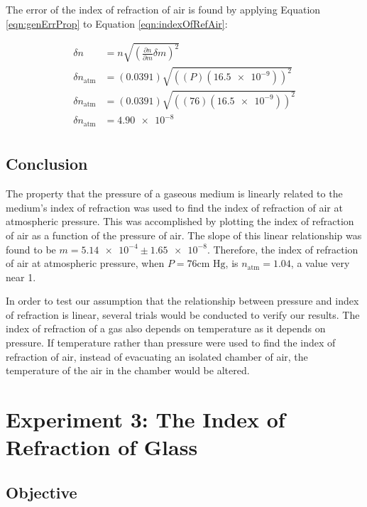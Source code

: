 \documentclass[12pt]{article}
\begin{document}
The error of the index of refraction of air is found by applying Equation
\ref{eqn:genErrProp} to Equation \ref{eqn:indexOfRefAir}:

\begin{align*}
  \delta n &= n \sqrt{\left( \frac{\partial n}{\partial m} \delta m \right) ^ 2}
  \\
  \delta n_{\text{atm}} &= (\num{0.0391}) \sqrt{\left( (P) (\num{16.5e-9})
                          \right) ^ 2} \\
  \delta n_{\text{atm}} &= (\num{0.0391}) \sqrt{\left( (76) (\num{16.5e-9})
                          \right) ^ 2} \\
  \delta n_{\text{atm}} &= \num{4.90e-8} \\
\end{align*}

\subsection{Conclusion}

\qq The property that the pressure of a gaseous medium is linearly related to
the medium's index of refraction was used to find the index of refraction of air
at atmospheric pressure. This was accomplished by plotting the index of
refraction of air as a function of the pressure of air. The slope of this linear
relationship was found to be \(m = \num{5.14e-4} \pm \num{1.65e-8}\). Therefore,
the index of refraction of air at atmospheric pressure, when \(P = 76 \text{cm
  Hg}\), is \(n_{\text{atm}} = 1.04\), a value very near 1.

\qq In order to test our assumption that the relationship between pressure and
index of refraction is linear, several trials would be conducted to verify our
results. The index of refraction of a gas also depends on temperature as it
depends on pressure. If temperature rather than pressure were used to find the
index of refraction of air, instead of evacuating an isolated chamber of air,
the temperature of the air in the chamber would be altered. 



\section{Experiment 3: The Index of Refraction of Glass}

\subsection{Objective}
\end{document}

